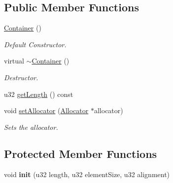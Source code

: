 \subsection*{Public Member Functions}
\begin{DoxyCompactItemize}
\item 
\hyperlink{classDE_1_1Container_a21e341b2726d98cd8de87b2804c4b0ea}{Container} ()\hypertarget{classDE_1_1Container_a21e341b2726d98cd8de87b2804c4b0ea}{}\label{classDE_1_1Container_a21e341b2726d98cd8de87b2804c4b0ea}

\begin{DoxyCompactList}\small\item\em Default Constructor. \end{DoxyCompactList}\item 
virtual \hyperlink{classDE_1_1Container_aa22155e6b8843498914f90c38154a1dd}{$\sim$\+Container} ()\hypertarget{classDE_1_1Container_aa22155e6b8843498914f90c38154a1dd}{}\label{classDE_1_1Container_aa22155e6b8843498914f90c38154a1dd}

\begin{DoxyCompactList}\small\item\em Destructor. \end{DoxyCompactList}\item 
u32 \hyperlink{classDE_1_1Container_ac4e1b4aefaecda0e225312fe463c9995}{get\+Length} () const 
\item 
void \hyperlink{classDE_1_1Container_ab75751a02a0ad81a235e8a98155f4c22}{set\+Allocator} (\hyperlink{classDE_1_1Allocator}{Allocator} $\ast$allocator)
\begin{DoxyCompactList}\small\item\em Sets the allocator. \end{DoxyCompactList}\end{DoxyCompactItemize}
\subsection*{Protected Member Functions}
\begin{DoxyCompactItemize}
\item 
void {\bfseries init} (u32 length, u32 element\+Size, u32 alignment)\hypertarget{classDE_1_1Container_a74ee311792f00a7fb3d07d8a0fe6c161}{}\label{classDE_1_1Container_a74ee311792f00a7fb3d07d8a0fe6c161}

\end{DoxyCompactItemize}
